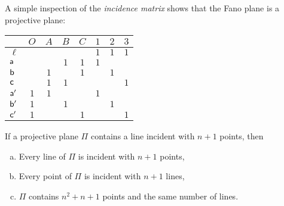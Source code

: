 \begin{xmpl}
    A simple inspection of the \textsl{incidence matrix} shows that the Fano plane is a projective plane:
    
    \medskip
    
    \begin{center}
        \begin{tabular}{l|ccccccc}
        &$O$&$A$&$B$&$C$&$1$&$2$&$3$\\
        \hline
        $\ell$&&&&&$1$&$1$&$1$\\
        $\mathsf a$&&&$1$&$1$&$1$\\
        $\mathsf b$&&$1$&&$1$&&$1$&\\
        $\mathsf c$&&$1$&$1$&&&&$1$\\
        $\mathsf a'$&$1$&$1$&&&$1$&&\\
        $\mathsf b'$&$1$&&$1$&&&$1$&\\
        $\mathsf c'$&$1$&&&$1$&&&$1$\\
    \end{tabular}
    \end{center}
\end{xmpl}

\begin{thm}\label{thm:order-is-well-defined}
    If\/ a projective plane\/ $\Pi$ contains a line incident with\/ $n+1$ points, then
    \begin{enumerate}[a),font=\upshape]
        \item Every line of\/ $\Pi$ is incident with\/ $n+1$ points,
        \item Every point of\/ $\Pi$ is incident with\/ $n+1$ lines,
        \item $\Pi$ contains\/ $n^2+n+1$ points and the same number of lines.
    \end{enumerate}
\end{thm}

